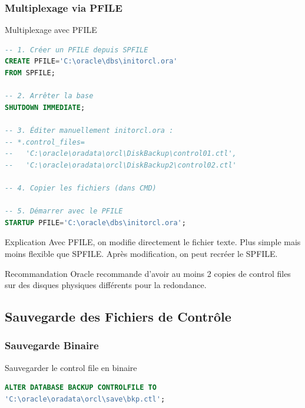 \documentclass[12pt,a4paper]{article}
\begin{document}
\subsubsection{Multiplexage via PFILE}

\begin{commande}{Multiplexage avec PFILE}
\begin{lstlisting}[language=SQL]
-- 1. Créer un PFILE depuis SPFILE
CREATE PFILE='C:\oracle\dbs\initorcl.ora' 
FROM SPFILE;

-- 2. Arrêter la base
SHUTDOWN IMMEDIATE;

-- 3. Éditer manuellement initorcl.ora :
-- *.control_files=
--   'C:\oracle\oradata\orcl\DiskBackup\control01.ctl',
--   'C:\oracle\oradata\orcl\DiskBackup2\control02.ctl'

-- 4. Copier les fichiers (dans CMD)

-- 5. Démarrer avec le PFILE
STARTUP PFILE='C:\oracle\dbs\initorcl.ora';
\end{lstlisting}
\end{commande}

\begin{explication}{Explication}
Avec PFILE, on modifie directement le fichier texte. Plus simple mais moins flexible que SPFILE. Après modification, on peut recréer le SPFILE.
\end{explication}

\begin{attention}{Recommandation}
Oracle recommande d'avoir au moins 2 copies de control files sur des disques physiques différents pour la redondance.
\end{attention}

\subsection{Sauvegarde des Fichiers de Contrôle}

\subsubsection{Sauvegarde Binaire}

\begin{commande}{Sauvegarder le control file en binaire}
\begin{lstlisting}[language=SQL]
ALTER DATABASE BACKUP CONTROLFILE TO 
'C:\oracle\oradata\orcl\save\bkp.ctl';
\end{lstlisting}
\end{commande}
\end{document}
